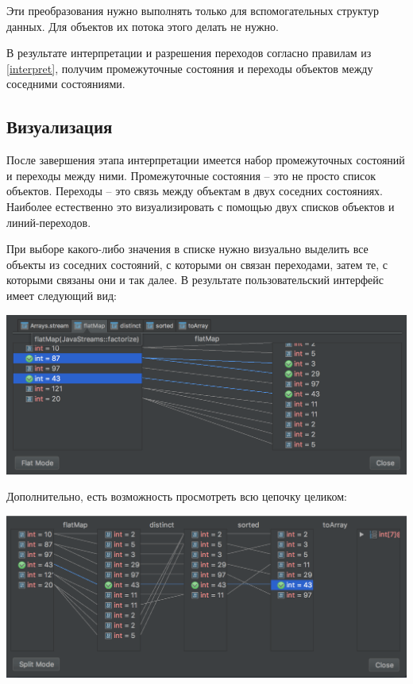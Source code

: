 Эти преобразования нужно выполнять только для вспомогательных структур данных. Для объектов их потока этого делать не нужно.

В результате интерпретации и разрешения переходов согласно правилам из \ref{interpret}, получим промежуточные состояния и переходы объектов между соседними состояниями.

\subsection{Визуализация}
После завершения этапа интерпретации имеется набор промежуточных состояний и переходы между ними. Промежуточные состояния -- это не просто список объектов. Переходы -- это связь между объектам в двух соседних состояниях. Наиболее естественно это визуализировать с помощью двух списков объектов и линий-переходов.

При выборе какого-либо значения в списке нужно визуально выделить все объекты из соседних состояний, с которыми он связан переходами, затем те, с которыми связаны они и так далее. 
\newpage
В результате пользовательский интерфейс имеет следующий вид:

\includegraphics[scale=0.3]{chapter3/img/split-view.png}

Дополнительно, есть возможность просмотреть всю цепочку целиком:

\includegraphics[scale=0.4]{chapter3/img/flat-view.png}










